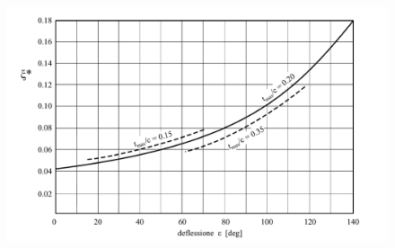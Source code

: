 \begin{figure}
\centering
  \includegraphics[width=\textwidth]{fig/Soderberg.pdf}
\caption{}
\label{fig:Soderberg}
\end{figure}
